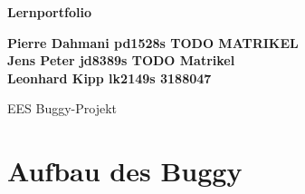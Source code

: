 \documentclass[12pt,twoside]{report}
\begin{document}
\begin{titlepage}
    \begin{center}
        \vspace*{1cm}
            
        \Huge
        \textbf{Lernportfolio}

        \vspace{1.5cm}
            
        \normalsize
        \textbf{Pierre Dahmani pd1528s TODO MATRIKEL\\
        Jens Peter jd8389s TODO Matrikel\\
        Leonhard Kipp lk2149s 3188047\\}
            
        \vfill
            
        EES Buggy-Projekt 
        \vspace{0.8cm}
            
        \pagebreak
    \end{center}
\end{titlepage}


\section{Aufbau des Buggy}
\end{document}
